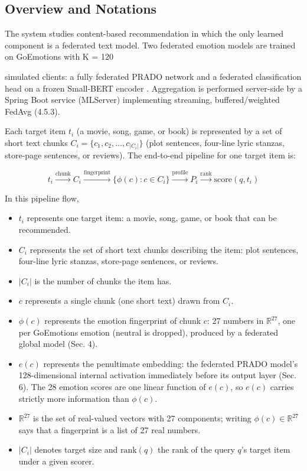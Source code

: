\subsection{Overview and Notations}
The system studies content-based recommendation in which the only learned component is a federated text model. Two federated emotion models are trained on GoEmotions with K = 120

simulated clients: a fully federated PRADO network and a federated classification head on a frozen Small-BERT encoder \cite{ref98}. Aggregation is performed server-side by a Spring Boot service (MLServer) implementing streaming, buffered/weighted FedAvg (4.5.3).

Each target item $t_{i}$ (a movie, song, game, or book) is represented by a set of short text chunks $C_{i} = \{c_{1}, c_{2}, \ldots, c_{|C_{i}|}\}$ (plot sentences, four-line lyric stanzas, store-page sentences, or reviews). The end-to-end pipeline for one target item is:

\begin{equation}
  t_{i} \xrightarrow{\text{chunk}} C_{i} \xrightarrow{\text{fingerprint}} \{\phi(c) : c \in C_{i}\} \xrightarrow{\text{profile}} P_{i} \xrightarrow{\text{rank}} \text{score}(q, t_{i})
  \label{eq:ch4_pipeline}
\end{equation}

\noindent In this pipeline flow,

\begin{itemize}
    \item $t_{i}$ represents one target item: a movie, song, game, or book that can be recommended.
    \item $C_{i}$ represents the set of short text chunks describing the item: plot sentences, four-line lyric stanzas, store-page sentences, or reviews.
    \item $|C_{i}|$ is the number of chunks the item has.
    \item $c$ represents a single chunk (one short text) drawn from $C_{i}$.
    \item $\phi(c)$ represents the emotion fingerprint of chunk $c$: 27 numbers in $\mathbb{R}^{27}$, one per GoEmotions emotion (neutral is dropped), produced by a federated global model (Sec. 4).
    \item $e(c)$ represents the penultimate embedding: the federated PRADO model's 128-dimensional internal activation immediately before its output layer (Sec. 6). The 28 emotion scores are one linear function of $e(c)$, so $e(c)$ carries strictly more information than $\phi(c)$.
    \item $\mathbb{R}^{27}$ is the set of real-valued vectors with 27 components; writing $\phi(c) \in \mathbb{R}^{27}$ says that a fingerprint is a list of 27 real numbers.
    \item $|C_{i}|$ denotes target size and $\text{rank}(q)$ the rank of the query $q$'s target item under a given scorer.
\end{itemize}

